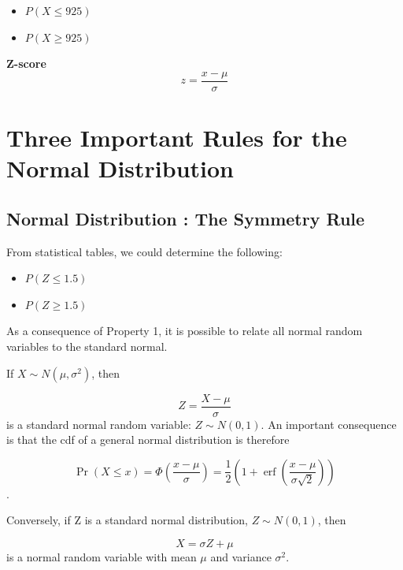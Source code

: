 \documentclass[]{report}
\begin{document}
\begin{itemize}
	\item $P(X \leq 925)$
	\item $P(X \geq 925)$
\end{itemize}




\textbf{Z-score}
\[ z =\frac{x - \mu}{\sigma}\]


\section{Three Important Rules for the Normal Distribution}


\subsection{Normal Distribution : The Symmetry Rule}

From statistical tables, we could determine the following:
\begin{itemize}
	\item $P(Z \leq 1.5) $
	\item $P(Z \geq 1.5) $
\end{itemize}



As a consequence of Property 1, it is possible to relate all normal random variables to the standard normal.

If $X \sim N(\mu, \sigma^2)$, then

\[Z = \frac{X - \mu}{\sigma} \]
is a standard normal random variable: $Z \sim N(0,1)$. An important consequence is that the cdf of a general normal distribution is therefore

\[\Pr(X \le x)
=
\Phi
\left(
\frac{x-\mu}{\sigma}
\right)
=
\frac{1}{2}
\left(
1 + \operatorname{erf}
\left(
\frac{x-\mu}{\sigma\sqrt{2}}
\right)
\right)\]
.








Conversely, if Z is a standard normal distribution, $Z \sim N(0,1)$, then

\[X = \sigma Z + \mu\]
is a normal random variable with mean $\mu$ and variance $\sigma^2$.
\end{document}
